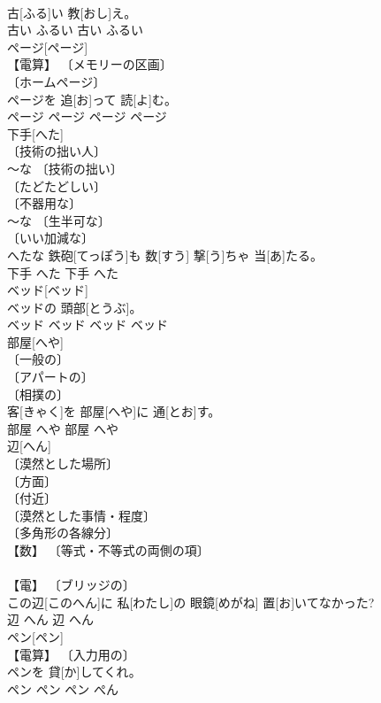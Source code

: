 \documentclass[8pt]{extreport}
\begin{document}
\begin{CJK}{UTF8}{min}
\\	古[ふる]い 教[おし]え。	
\\	古い	ふるい	古い	ふるい	
\\	ページ[ページ]	
\\	【電算】 〔メモリーの区画〕 
\\	〔ホームページ〕 
\\	ページを 追[お]って 読[よ]む。	
\\	ページ	ページ	ページ	ページ	
\\	下手[へた]	
\\	〔技術の拙い人〕 
\\	～な 〔技術の拙い〕 
\\	〔たどたどしい〕 
\\	〔不器用な〕 
\\	～な 〔生半可な〕 
\\	〔いい加減な〕 
\\	へたな 鉄砲[てっぽう]も 数[すう] 撃[う]ちゃ 当[あ]たる。	
\\	下手	へた	下手	へた	
\\	ベッド[ベッド]	
\\	ベッドの 頭部[とうぶ]。	
\\	ベッド	ベッド	ベッド	ベッド	
\\	部屋[へや]	
\\	〔一般の〕 
\\	〔アパートの〕 
\\	〔相撲の〕 
\\	客[きゃく]を 部屋[へや]に 通[とお]す。	
\\	部屋	へや	部屋	へや	
\\	辺[へん]	
\\	〔漠然とした場所〕 
\\	〔方面〕 
\\	〔付近〕 
\\	〔漠然とした事情・程度〕 
\\	〔多角形の各線分〕 
\\	【数】 〔等式・不等式の両側の項〕 
\\	[⇒うへん１, さへん, りょうへん] 
\\	【電】 〔ブリッジの〕 
\\	この辺[このへん]に 私[わたし]の 眼鏡[めがね] 置[お]いてなかった?	
\\	辺	へん	辺	へん	
\\	ペン[ペン]	
\\	【電算】 〔入力用の〕 
\\	ペンを 貸[か]してくれ。	
\\	ペン	ペン	ペン	ぺん	

\end{CJK}
\end{document}
